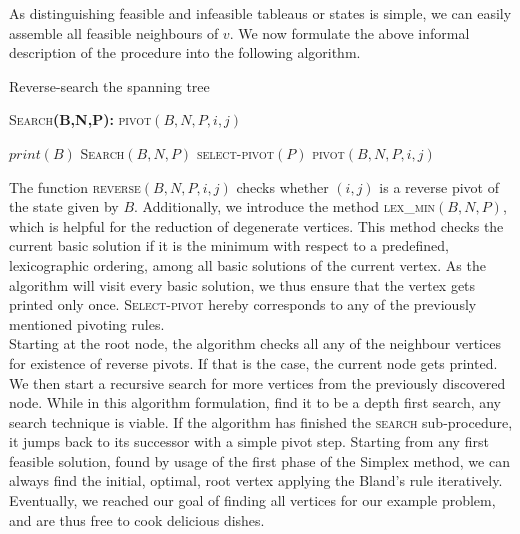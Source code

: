 \documentclass[a4paper, 11pt]{article}
\begin{document}
As distinguishing feasible and infeasible tableaus or states is simple, we can easily assemble all feasible neighbours of $v$. We now formulate the above informal description of the procedure into the following algorithm.

\begin{algorithm}[H]
	\caption{Reverse-search the spanning tree}
	\label{alg:seq}
	\begin{algorithmic}[1]
		\STATE \textsc{Search}\textbf{(B,N,P):}
		\STATE \textsc{pivot}$(B,N,P,i,j)$
		
		\STATE $print(B)$
		\ENDIF
		\STATE \textsc{Search}$(B,N,P)$
		\STATE \textsc{select-pivot}$(P)$
		\STATE \textsc{pivot}$(B,N,P,i,j)$
		
		\ENDIF
		\ENDFOR
	\end{algorithmic}
\end{algorithm}

The function \textsc{reverse}$(B,N,P,i,j)$ checks  whether $(i,j)$ is a reverse pivot of the state given by $B$. Additionally, we introduce the method \textsc{lex\_min}$(B,N,P)$, which is helpful for the reduction of degenerate vertices. This method checks the current basic solution if it is the minimum with respect to a predefined, lexicographic ordering, among all basic solutions of the current vertex. As the algorithm will visit every basic solution, we thus ensure that the vertex gets printed only once. \textsc{Select-pivot} hereby corresponds to any of the previously mentioned pivoting rules.\\ 

Starting at the root node, the algorithm checks all any of the neighbour vertices for existence of reverse pivots. If that is the case, the current node gets printed. We then start a recursive search for more vertices from the previously discovered node. While in this algorithm formulation, find it to be a depth first search, any search technique is viable. If the algorithm has finished the \textsc{search} sub-procedure, it jumps back to its successor with a simple pivot step. Starting from any first feasible solution, found by usage of the first phase of the Simplex method, we can always find the initial, optimal, root vertex applying the Bland's rule iteratively.\\

Eventually, we reached our goal of finding all vertices for our example problem, and are thus free to cook delicious dishes. 
\end{document}
